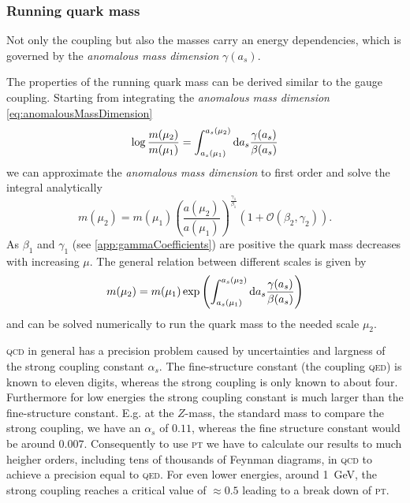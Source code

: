 \documentclass[../../index.tex]{subfiles}
\begin{document}
\subsubsection{Running quark mass}
Not only the coupling but also the masses carry an energy dependencies, which is
governed by the \textit{anomalous mass dimension} $\gamma(a_s)$.

The properties of the running quark mass can be derived similar to the gauge
coupling. Starting from integrating the \textit{anomalous mass dimension}
\cref{eq:anomalousMassDimension}
\begin{equation}
  \log \frac{m(\mu_2)}{m(\mu_1)} = \int_{a_s(\mu_1)}^{a_s(\mu_2)} \dif a_s \frac{\gamma(a_s)}{\beta(a_s)}
\end{equation}
we can approximate the \textit{anomalous mass dimension} to first order and
solve the integral analytically \cite{Schwab2002}
\begin{equation}
  m(\mu_2) = m(\mu_1)\left( \frac{a(\mu_2)}{a(\mu_1)} \right)^{\frac{\gamma_1}{\beta_1}} \left( 1 + \mathcal{O}(\beta_2, \gamma_2) \right).
\end{equation}
As $\beta_1$ and $\gamma_1$ (see \ref{app:gammaCoefficients}) are positive the
quark mass decreases with increasing $\mu$. The general relation between
different scales is given by
\begin{equation}
  m(\mu_2) = m(\mu_1) \exp \left( \int_{a_s(\mu_1)}^{a_s(\mu_2)} \dif a_s \frac{\gamma(a_s)}{\beta(a_s)}  \right)
\end{equation}
and can be solved numerically to run the quark mass to the needed scale $\mu_2$.

\textsc{qcd} in general has a precision problem caused by uncertainties and largness of
the strong coupling constant $\alpha_s$. The fine-structure constant (the
coupling \textsc{qed}) is known to eleven digits, whereas the strong coupling
is only known to about four. Furthermore for low energies the strong coupling
constant is much larger than the fine-structure constant. E.g. at the $Z$-mass,
the standard mass to compare the strong coupling, we have an $\alpha_s$ of
$0.11$, whereas the fine structure constant would be around $0.007$.
Consequently to use \textsc{pt} we have to calculate our results to much heigher orders,
including tens of thousands of Feynman diagrams, in \textsc{qcd} to achieve a precision
equal to \textsc{qed}. For even lower energies, around \SI{1}{\giga\eV}, the strong
coupling reaches a critical value of $\approx 0.5$ leading to a break down of
\textsc{pt}.
\end{document}

